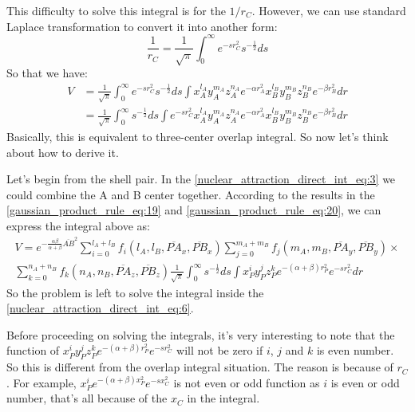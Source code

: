 This difficulty to solve this integral is for the $1/r_{C}$. However, we can use standard
Laplace transformation to convert it into another form:
\begin{equation}
\label{nuclear_attraction_direct_int_eq:2}
 \frac{1}{r_{C}} = \frac{1}{\sqrt{\pi}}\int^{\infty}_{0} e^{-sr_{C}^{2}} s^{-\frac{1}{2}} ds
\end{equation}
So that we have:
\begin{equation}
 \begin{split}
V &= \frac{1}{\sqrt{\pi}}\int^{\infty}_{0} e^{-sr_{C}^{2}} s^{-\frac{1}{2}} ds 
          \int x^{l_{A}}_{A}y^{m_{A}}_{A}z^{n_{A}}_{A}e^{-\alpha r_{A}^{2}}
          x^{l_{B}}_{B}y^{m_{B}}_{B}z^{n_{B}}_{B}e^{-\beta  r_{B}^{2}} dr \\
       &= \frac{1}{\sqrt{\pi}}\int^{\infty}_{0}  s^{-\frac{1}{2}} ds  
          \int e^{-sr_{C}^{2}} 
          x^{l_{A}}_{A}y^{m_{A}}_{A}z^{n_{A}}_{A}e^{-\alpha r_{A}^{2}}
          x^{l_{B}}_{B}y^{m_{B}}_{B}z^{n_{B}}_{B}e^{-\beta  r_{B}^{2}} dr
 \end{split}
\label{nuclear_attraction_direct_int_eq:3}
\end{equation}
Basically, this is equivalent to three-center overlap integral. So now let's think about
how to derive it.

Let's begin from the shell pair. In the \ref{nuclear_attraction_direct_int_eq:3} we could combine the 
A and B center together. According to the results in the 
\ref{gaussian_product_rule_eq:19} and \ref{gaussian_product_rule_eq:20}, we can express 
the integral above as:
\begin{multline}
  V = e^{-\frac{\alpha\beta}{\alpha+\beta}\overline{AB}^{2}} 
\sum_{i=0}^{l_{A}+l_{B}}f_{i}(l_{A},l_{B},\overline{PA}_{x},\overline{PB}_{x})
\sum_{j=0}^{m_{A}+m_{B}}f_{j}(m_{A},m_{B},\overline{PA}_{y},\overline{PB}_{y}) \times \\
\sum_{k=0}^{n_{A}+n_{B}}f_{k}(n_{A},n_{B},\overline{PA}_{z},\overline{PB}_{z}) 
   \frac{1}{\sqrt{\pi}} 
   \int^{\infty}_{0} s^{-\frac{1}{2}} ds 
   \int x_{P}^{i}y_{P}^{j}z_{P}^{k} e^{-(\alpha+\beta)r_{P}^{2}}e^{-sr_{C}^{2}} dr
\label{nuclear_attraction_direct_int_eq:6}
\end{multline}
So the problem is left to solve the integral inside the \ref{nuclear_attraction_direct_int_eq:6}.

Before proceeding on solving the integrals, it's very interesting to note that the function of 
$x_{P}^{i}y_{P}^{j}z_{P}^{k} e^{-(\alpha+\beta)r_{P}^{2}}e^{-sr_{C}^{2}}$ will not be zero if 
$i$, $j$ and $k$ is even number. So this is different from the overlap integral situation. 
The reason is because of $r_{C}$. For example, 
$ x_{P}^{i} e^{-(\alpha+\beta)x_{P}^{2}}e^{-sx_{C}^{2}} $ is not 
even or odd function as $i$ is even or odd number, that's all because of the $x_{C}$ in the 
integral.

